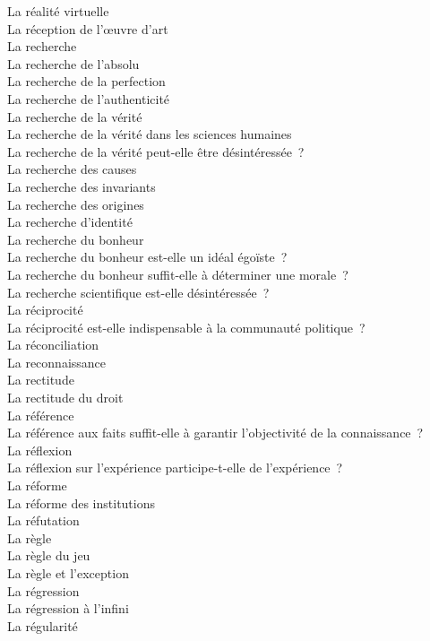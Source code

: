 \documentclass[a4paper,12pt]{article}
\begin{document}
La réalité virtuelle \\
La réception de l'œuvre d'art \\
La recherche \\
La recherche de l'absolu \\
La recherche de la perfection \\
La recherche de l'authenticité \\
La recherche de la vérité \\
La recherche de la vérité dans les sciences humaines \\
La recherche de la vérité peut-elle être désintéressée ? \\
La recherche des causes \\
La recherche des invariants \\
La recherche des origines \\
La recherche d'identité \\
La recherche du bonheur \\
La recherche du bonheur est-elle un idéal égoïste ? \\
La recherche du bonheur suffit-elle à déterminer une morale ? \\
La recherche scientifique est-elle désintéressée ? \\
La réciprocité \\
La réciprocité est-elle indispensable à la communauté politique ? \\
La réconciliation \\
La reconnaissance \\
La rectitude \\
La rectitude du droit \\
La référence \\
La référence aux faits suffit-elle à garantir l'objectivité de la connaissance ? \\
La réflexion \\
La réflexion sur l'expérience participe-t-elle de l'expérience ? \\
La réforme \\
La réforme des institutions \\
La réfutation \\
La règle \\
La règle du jeu \\
La règle et l'exception \\
La régression \\
La régression à l'infini \\
La régularité \\
\end{document}
